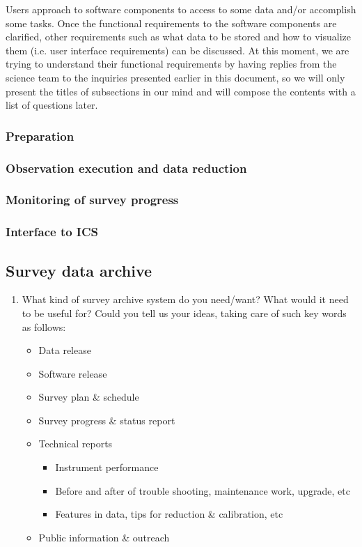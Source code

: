 \documentclass[a4paper,notitlepage]{article}
\begin{document}
Users approach to software components to access to some data and/or
accomplish some tasks. Once the functional requirements to the software
components are clarified, other requirements such as what data to be
stored and how to visualize them (i.e. user interface requirements) can
be discussed. At this moment, we are trying to understand their
functional requirements by having replies from the science team to the
inquiries presented earlier in this document, so we will only present
the titles of subsections in our mind and will compose the contents with
a list of questions later.

\subsubsection{Preparation}

\subsubsection{Observation execution and data reduction}

\subsubsection{Monitoring of survey progress}

\subsubsection{Interface to ICS}


\subsection{Survey data archive}

\begin{enumerate}
 \item[\cols{a}] What kind of survey archive system do you need/want?
          What would it need to be useful for? Could you tell us
          your ideas, taking care of such key words as follows:
          \begin{itemize}
           \item Data release
           \item Software release
           \item Survey plan \& schedule
           \item Survey progress \& status report
           \item Technical reports
             \begin{itemize}
              \item Instrument performance
              \item Before and after of trouble shooting,
                maintenance work, upgrade, etc
              \item Features in data, tips for
                reduction \& calibration, etc
             \end{itemize}
           \item Public information \& outreach
          \end{itemize}
\end{enumerate}
\end{document}

